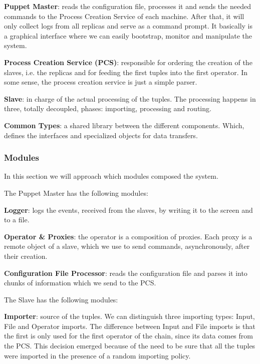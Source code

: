 \documentclass[times, 10pt,twocolumn]{article}
\begin{document}
\textbf{Puppet Master}: reads the configuration file, processes it and sends the needed commands to the Process Creation Service of each machine. After that, it will only collect logs from all replicas and serve as a command prompt. It basically is a graphical interface where we can easily bootstrap, monitor and manipulate the system.

\textbf{Process Creation Service (PCS)}: responsible for ordering the creation of the slaves, i.e. the replicas and for feeding the first tuples into the first operator. In some sense, the process creation service is just a simple parser.

\textbf{Slave}: in charge of the actual processing of the tuples. The processing happens in three, totally decoupled, phases: importing, processing and routing. 

\textbf{Common Types}: a shared library between the different components. Which, defines the interfaces and specialized objects for data transfers.




\subsubsection{Modules}

In this section we will approach which modules composed the system.

The Puppet Master has the following modules: 

\textbf{Logger}: logs the events, received from the slaves, by writing it to the screen and to a file.

\textbf{Operator \& Proxies}: the operator is a composition of proxies. Each proxy is a remote object of a slave, which we use to send commands, asynchronously, after their creation.

\textbf{Configuration File Processor}: reads the configuration file and parses it into chunks of information which we send to the PCS.

The Slave has the following modules:

\textbf{Importer}: source of the tuples. We can distinguish three importing types: Input, File and Operator imports. The difference between Input and File imports is that the first is only used for the first operator of the chain, since its data comes from the PCS. This decision emerged because of the need to be sure that all the tuples were imported in the presence of a random importing policy. 
\end{document}
